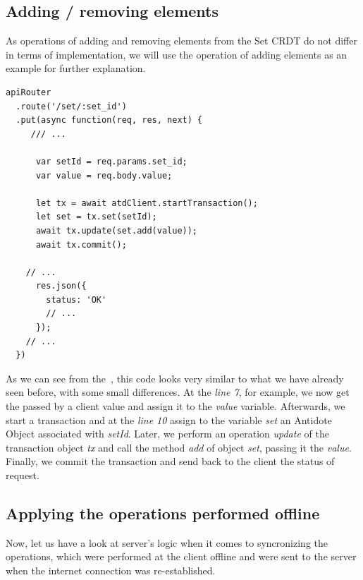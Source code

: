 \subsection*{Adding / removing elements}

As operations of adding and removing elements from the Set CRDT do not differ in terms of implementation, we will use the operation of adding elements as an example for further explanation.

\begin{lstlisting}[caption={Code for applying an \textit{add} operation to a Set CRDT.}, label={lst:dev2}]
apiRouter
  .route('/set/:set_id')
  .put(async function(req, res, next) {
     /// ...

      var setId = req.params.set_id;
      var value = req.body.value;      

      let tx = await atdClient.startTransaction();
      let set = tx.set(setId);
      await tx.update(set.add(value));
      await tx.commit();

    // ...
      res.json({
        status: 'OK'
        // ...
      });
    // ...
  })
\end{lstlisting} 

As we can see from the~, this code looks very similar to what we have already seen before, with some small differences. At the \textit{line 7}, for example, we now get the passed by a client value and assign it to the \textit{value} variable. Afterwards, we start a transaction and at the \textit{line 10} assign to the variable \textit{set} an Antidote Object associated with \textit{setId}. Later, we perform an operation \textit{update} of the transaction object \textit{tx} and call the method \textit{add} of object \textit{set}, passing it the \textit{value}. Finally, we commit the transaction and send back to the client the status of request.

\subsection*{Applying the operations performed offline}

Now, let us have a look at server's logic when it comes to syncronizing the operations, which were performed at the client offline and were sent to the server when the internet connection was re-established.

